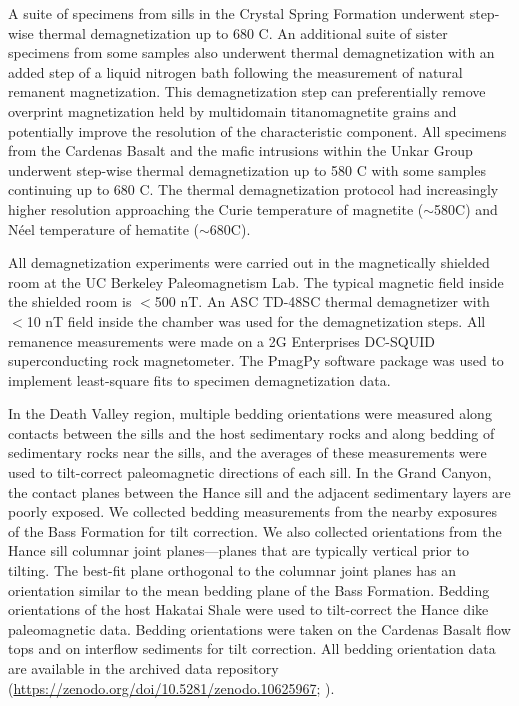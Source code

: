 A suite of specimens from sills in the Crystal Spring Formation underwent step-wise thermal demagnetization up to 680 \textdegree C. An additional suite of sister specimens from some samples also underwent thermal demagnetization with an added step of a liquid nitrogen bath following the measurement of natural remanent magnetization. This demagnetization step can preferentially remove overprint magnetization held by multidomain titanomagnetite grains and potentially improve the resolution of the characteristic component. All specimens from the Cardenas Basalt and the mafic intrusions within the Unkar Group underwent step-wise thermal demagnetization up to 580 \textdegree C with some samples continuing up to 680 \textdegree C. The thermal demagnetization protocol had increasingly higher resolution approaching the Curie temperature of magnetite ($\sim$580\textdegree C) and N\'eel temperature of hematite ($\sim$680\textdegree C).

All demagnetization experiments were carried out in the magnetically shielded room at the UC Berkeley Paleomagnetism Lab. The typical magnetic field inside the shielded room is $<$500 nT. An ASC TD-48SC thermal demagnetizer with $<$10 nT field inside the chamber was used for the demagnetization steps. All remanence measurements were made on a 2G Enterprises DC-SQUID superconducting rock magnetometer. The PmagPy software package \cite{Tauxe2016a} was used to implement least-square fits \cite{Kirschvink1980a} to specimen demagnetization data. 

In the Death Valley region, multiple bedding orientations were measured along contacts between the sills and the host sedimentary rocks and along bedding of sedimentary rocks near the sills, and the averages of these measurements were used to tilt-correct paleomagnetic directions of each sill. In the Grand Canyon, the contact planes between the Hance sill and the adjacent sedimentary layers are poorly exposed. We collected bedding measurements from the nearby exposures of the Bass Formation for tilt correction. We also collected orientations from the Hance sill columnar joint planes---planes that are typically vertical prior to tilting. The best-fit plane orthogonal to the columnar joint planes has an orientation similar to the mean bedding plane of the Bass Formation. Bedding orientations of the host Hakatai Shale were used to tilt-correct the Hance dike paleomagnetic data. Bedding orientations were taken on the Cardenas Basalt flow tops and on interflow sediments for tilt correction. All bedding orientation data are available in the archived data repository (\url{https://zenodo.org/doi/10.5281/zenodo.10625967}; ).

